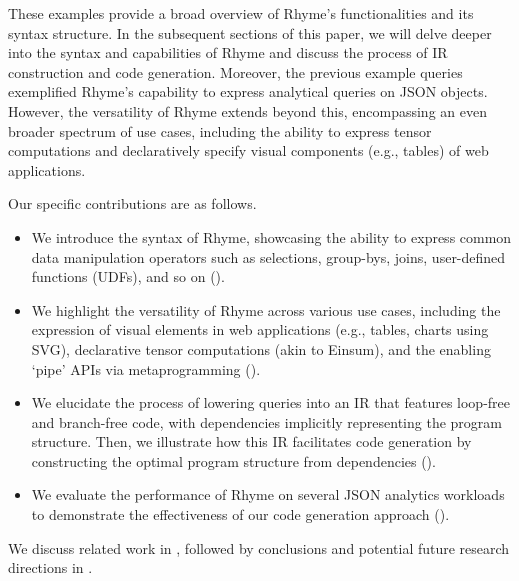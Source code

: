 \documentclass[runningheads]{llncs}
\newcommand{\lang}{Rhyme}
\begin{document}
These examples provide a broad overview of \lang{}'s functionalities and its
syntax structure.
In the subsequent sections of this paper, we will delve deeper into the syntax and capabilities
of \lang{} and discuss the process of IR construction and code generation.
Moreover, the previous example queries exemplified \lang{}'s capability to
express analytical queries on JSON objects.
However, the versatility of \lang{} extends beyond this, encompassing an even broader
spectrum of use cases, including the ability to express tensor computations and declaratively specify
visual components (e.g., tables) of web applications.

Our specific contributions are as follows.
\begin{itemize}
    \item We introduce the syntax of \lang{}, showcasing the ability to express common data
          manipulation operators such as selections, group-bys, joins, user-defined functions (UDFs),
          and so on ().
    \item We highlight the versatility of \lang{} across various use cases, including the expression
          of visual elements in web applications (e.g., tables, charts using SVG), declarative
          tensor computations (akin to Einsum), and the enabling `pipe' APIs via metaprogramming ().
    \item We elucidate the process of lowering queries into an IR that features loop-free and
          branch-free code, with dependencies implicitly representing the program structure.
          Then, we illustrate how this IR facilitates code generation by constructing the optimal program
          structure from dependencies ().
    \item We evaluate the performance of \lang{} on several JSON analytics workloads
          to demonstrate the effectiveness of our code generation approach ().
\end{itemize} 

We discuss related work in , followed by conclusions and potential future research directions
in .


\vspace{-4mm}
\end{document}
